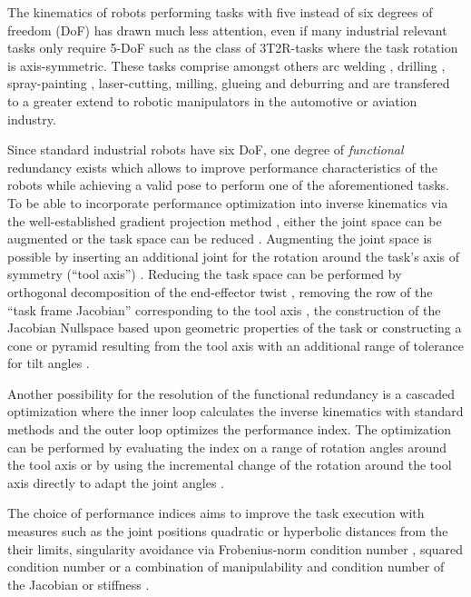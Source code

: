 \documentclass[twocolumn,10pt]{IFTOMM}
\begin{document}
The kinematics of robots performing tasks with five instead of six degrees of freedom (DoF) has drawn much less attention, even if many industrial relevant tasks only require 5-DoF such as the class of 3T2R-tasks where the task rotation is axis-symmetric.
These tasks comprise amongst others arc welding \cite{HuoBar2005}, drilling \cite{ZhuQuCaoYan2013,GuoDonKe2015}, spray-painting \cite{FromGra2010}, laser-cutting, milling, glueing and deburring and are transfered to a greater extend to robotic manipulators in the automotive or aviation industry.

Since standard industrial robots have six DoF, one degree of \emph{functional} redundancy exists which allows to improve performance characteristics of the robots while achieving a valid pose to perform one of the aforementioned tasks.
To be able to incorporate performance optimization into inverse kinematics via the well-established gradient projection method \cite{Yoshikawa1984}, either the joint space can be augmented or the task space can be reduced \cite{Huo2009}.
Augmenting the joint space is possible by inserting an additional joint for the rotation around the task's axis of symmetry (``tool axis'') \cite{Baron2000}.
Reducing the task space can be performed by orthogonal decomposition of the end-effector twist \cite{HuoBar2005}, removing the row of the ``task frame Jacobian'' corresponding to the tool axis \cite{Zlajpah2017}, the construction of the Jacobian Nullspace based upon geometric properties of the task \cite{LegerAng2016} or constructing a cone or pyramid resulting from the tool axis with an additional range of tolerance for tilt angles \cite{FromGra2010}.

Another possibility for the resolution of the functional redundancy is a cascaded optimization where the inner loop calculates the inverse kinematics with standard methods and the outer loop optimizes the performance index.
The optimization can be performed by evaluating the index on a range of rotation angles around the tool axis \cite{ZhuQuCaoYan2013} or by using the incremental change of the rotation around the tool axis directly to adapt the joint angles \cite{GuoDonKe2015}.

The choice of performance indices aims to improve the task execution with measures such as the joint positions quadratic \cite{HuoBar2005} or hyperbolic \cite{ZhuQuCaoYan2013} distances from the their limits, singularity avoidance via Frobenius-norm condition number \cite{ZhuQuCaoYan2013}, squared condition number \cite{LegerAng2016} or a combination of manipulability and condition number of the Jacobian \cite{HuoBar2008} or stiffness \cite{GuoDonKe2015}.
\end{document}
